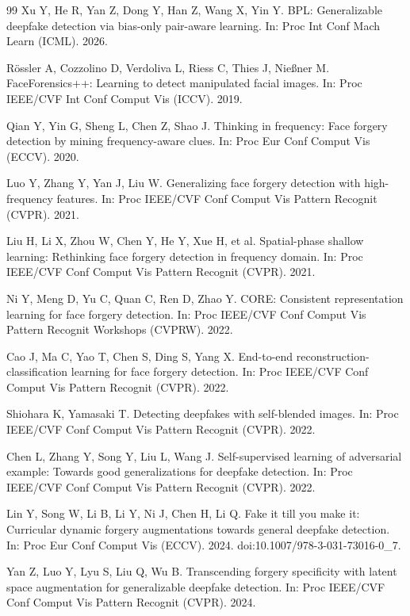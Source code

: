 \documentclass[fonts]{icst}
\begin{document}
\begin{thebibliography}{99}
Xu Y, He R, Yan Z, Dong Y, Han Z, Wang X, Yin Y.
BPL: Generalizable deepfake detection via bias-only pair-aware learning.
In: Proc Int Conf Mach Learn (ICML). 2026.

R{\"o}ssler A, Cozzolino D, Verdoliva L, Riess C, Thies J, Nie{\ss}ner M.
FaceForensics++: Learning to detect manipulated facial images.
In: Proc IEEE/CVF Int Conf Comput Vis (ICCV). 2019.

Qian Y, Yin G, Sheng L, Chen Z, Shao J.
Thinking in frequency: Face forgery detection by mining frequency-aware clues.
In: Proc Eur Conf Comput Vis (ECCV). 2020.

Luo Y, Zhang Y, Yan J, Liu W.
Generalizing face forgery detection with high-frequency features.
In: Proc IEEE/CVF Conf Comput Vis Pattern Recognit (CVPR). 2021.

Liu H, Li X, Zhou W, Chen Y, He Y, Xue H, et al.
Spatial-phase shallow learning: Rethinking face forgery detection in frequency domain.
In: Proc IEEE/CVF Conf Comput Vis Pattern Recognit (CVPR). 2021.

Ni Y, Meng D, Yu C, Quan C, Ren D, Zhao Y.
CORE: Consistent representation learning for face forgery detection.
In: Proc IEEE/CVF Conf Comput Vis Pattern Recognit Workshops (CVPRW). 2022.

Cao J, Ma C, Yao T, Chen S, Ding S, Yang X.
End-to-end reconstruction-classification learning for face forgery detection.
In: Proc IEEE/CVF Conf Comput Vis Pattern Recognit (CVPR). 2022.

Shiohara K, Yamasaki T.
Detecting deepfakes with self-blended images.
In: Proc IEEE/CVF Conf Comput Vis Pattern Recognit (CVPR). 2022.

Chen L, Zhang Y, Song Y, Liu L, Wang J.
Self-supervised learning of adversarial example: Towards good generalizations for deepfake detection.
In: Proc IEEE/CVF Conf Comput Vis Pattern Recognit (CVPR). 2022.

Lin Y, Song W, Li B, Li Y, Ni J, Chen H, Li Q.
Fake it till you make it: Curricular dynamic forgery augmentations towards general deepfake detection.
In: Proc Eur Conf Comput Vis (ECCV). 2024. doi:10.1007/978-3-031-73016-0\_7.

Yan Z, Luo Y, Lyu S, Liu Q, Wu B.
Transcending forgery specificity with latent space augmentation for generalizable deepfake detection.
In: Proc IEEE/CVF Conf Comput Vis Pattern Recognit (CVPR). 2024.


\end{thebibliography}
\end{document}
